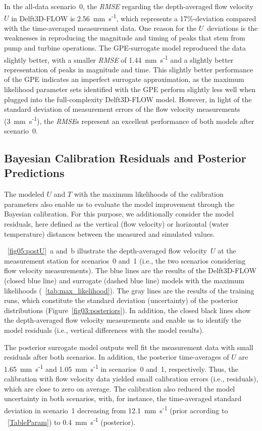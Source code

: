 \documentclass[draft,linenumbers,onecolumn]{agujournal2019} %
\begin{document}
In the all-data scenario~0, the \textit{RMSE} regarding the depth-averaged flow velocity $U$ in Delft3D-FLOW is 2.56~mm~s\textsuperscript{-1}, which represents a 17\%-deviation compared with the time-averaged measurement data. One reason for the $U$~deviations is the weaknesses in reproducing the magnitude and timing of peaks that stem from pump and turbine operations. The GPE-surrogate model reproduced the data slightly better, with a smaller \textit{RMSE} of 1.44~mm~s\textsuperscript{-1} and a slightly better representation of peaks in magnitude and time. This slightly better performance of the GPE indicates an imperfect surrogate approximation, as the maximum likelihood parameter sets identified with the GPE perform slightly less well when plugged into the full-complexity Delft3D-FLOW model. However, in light of the standard deviation of measurement errors of the flow velocity measurements (3~mm~s\textsuperscript{-1}), the \textit{RMSE}s represent an excellent performance of both models after scenario~0.


\subsection{Bayesian Calibration Residuals and Posterior Predictions}

The modeled $U$ and $T$ with the maximum likelihoods of the calibration parameters also enable us to evaluate the model improvement through the Bayesian calibration. For this purpose, we additionally consider the model residuals, here defined as the vertical (flow velocity) or horizontal (water temperature) distances between the measured and simulated values. 

\figurename{~\ref{fig05:postU}}~a and~b illustrate the depth-averaged flow velocity~$U$ at the measurement station for scenarios~0 and~1 (i.e., the two scenarios considering flow velocity measurements). The blue lines are the results of the Delft3D-FLOW (closed blue line) and surrogate (dashed blue line) models with the maximum likelihoods (\tablename{~\ref{tab:max_likelihood}}). The gray lines are the results of the training runs, which constitute the standard deviation (uncertainty) of the posterior distributions (Figure~\ref{fig03:posteriors}). In addition, the closed black lines show the depth-averaged flow velocity measurements and enable us to identify the model residuals (i.e., vertical differences with the model results).

The posterior surrogate model outputs well fit the measurement data with small residuals after both scenarios. In addition, the posterior time-averages of $U$ are 1.65~mm~s\textsuperscript{-1} and 1.05~mm~s\textsuperscript{-1} in scenarios~0 and~1, respectively. Thus, the calibration with flow velocity data yielded small calibration errors (i.e., residuals), which are close to zero on average. The calibration also reduced the model uncertainty in both scenarios, with, for instance, the time-averaged standard deviation in scenario~1 decreasing from 12.1~mm~s\textsuperscript{-1} (prior according to \tablename{~\ref{TableParam}}) to 0.4~mm~s\textsuperscript{-1} (posterior).
\end{document}
